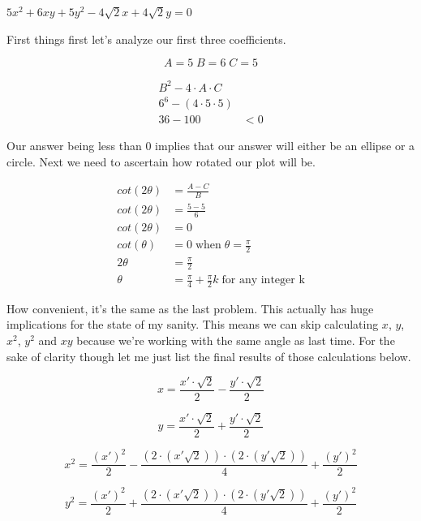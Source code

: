 \begin{problem}[3]
    $5x^2 + 6xy + 5y^2 - 4\sqrt{2}x + 4\sqrt{2}y = 0$
\end{problem}

\begin{solution}[Solution]
    First things first let's analyze our first three coefficients. 
    
    \[ \boxed{A = 5} \; \boxed{B = 6} \; \boxed{C = 5} \]
    
    \begin{align}
        B^2 - 4 \cdot A \cdot C & \\
        6^6 - (4 \cdot 5 \cdot 5) & \\
        36 - 100 &< 0
    \end{align}
    
    Our answer being less than 0 implies that our answer will either be an ellipse or a circle. Next we need to ascertain how rotated our plot will be.
    
    \begin{align}
        cot(2\theta) &= \frac{A - C}{B} \\
        cot(2\theta) &= \frac{5-5}{6} \\
        cot(2\theta) &= 0 \\
        cot(\theta) &= 0 \; \text{when} \; \theta = \frac{\pi}{2} \\
        2\theta &= \frac{\pi}{2} \\
        \theta &= \frac{\pi}{4} + \frac{\pi}{2}k \; \text{for any integer k}
    \end{align}
    
    How convenient, it's the same as the last problem. This actually has huge implications for the state of my sanity. This means we can skip calculating $x$, $y$, $x^2$, $y^2$ and $xy$ because we're working with the same angle as last time. For the sake of clarity though let me just list the final results of those calculations below.
    
    \[\boxed{x = \frac{x' \cdot \sqrt{2}}{2} - \frac{y' \cdot \sqrt{2}}{2}}\]
    
    \[\boxed{y = \frac{x' \cdot \sqrt{2}}{2} + \frac{y' \cdot \sqrt{2}}{2}}\]
    
    \[\boxed{x^2 = \frac{(x')^2}{2} - \frac{(2\cdot (x' \sqrt{2})) \cdot (2 \cdot (y' \sqrt{2}))}{4} + \frac{(y')^2}{2}}\]
    
    \[\boxed{y^2 = \frac{(x')^2}{2} + \frac{(2\cdot (x' \sqrt{2})) \cdot (2 \cdot (y' \sqrt{2}))}{4} + \frac{(y')^2}{2}}\]
    

\end{solution}
